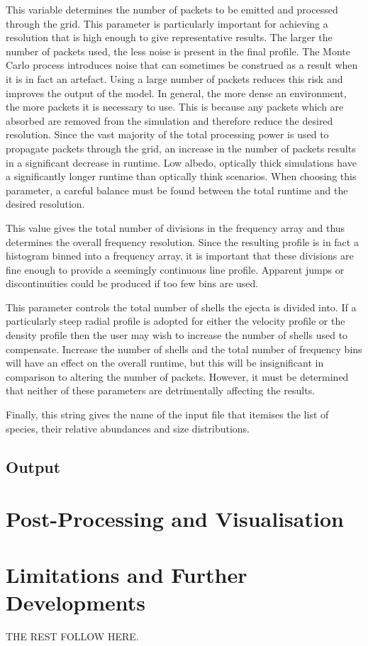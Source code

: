This variable determines the number of packets to be emitted and processed through the grid.  This parameter is particularly important for achieving a resolution that is high enough to give representative results.  The larger the number of packets used, the less noise is present in the final profile.  The Monte Carlo process introduces noise that can sometimes be construed as a result when it is in fact an artefact.  Using a large number of packets reduces this risk and improves the output of the model.  In general, the more dense an environment, the more packets it is necessary to use.  This is because any packets which are absorbed are removed from the simulation and therefore reduce the desired resolution.  Since the vast majority of the total processing power is used to propagate packets through the grid, an increase in the number of packets results in a significant decrease in runtime. Low albedo, optically thick simulations have a significantly longer runtime than optically think scenarios.  When choosing this parameter, a careful balance must be found between the total runtime and the desired resolution. 



This value gives the total number of divisions in the frequency array and thus determines the overall frequency resolution.  Since the resulting profile is in fact a histogram binned into a frequency array, it is important that these divisions are fine enough to provide a seemingly continuous line profile.  Apparent jumps or discontinuities could be produced if too few bins are used.


This parameter controls the total number of shells the ejecta is divided into.  If a particularly steep radial profile is adopted for either the velocity profile or the density profile then the user may wish to increase the number of shells used to compensate.  Increase the number of shells and the total number of frequency bins will have an effect on the overall runtime, but this will be insignificant in comparison to altering the number of packets.  However, it must be determined that neither of these parameters are detrimentally affecting the results.



Finally, this string gives the name of the input file that itemises the list of species, their relative abundances and size distributions.

\subsection{Output}
\section{Post-Processing and Visualisation}
\section{Limitations and Further Developments}
\label{limitations}

\clearpage
		


THE REST FOLLOW HERE. 


